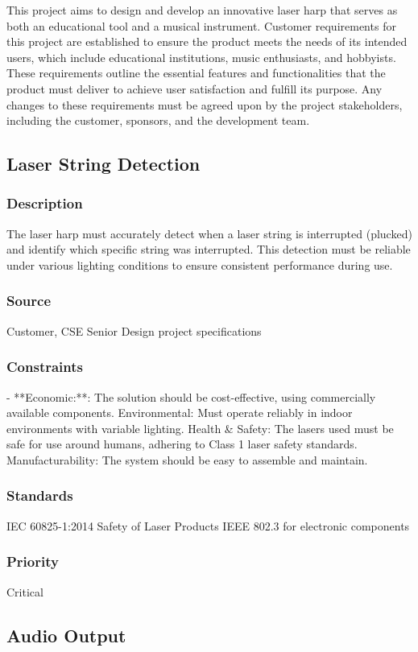 This project aims to design and develop an innovative laser harp that serves as both an educational tool and a musical instrument. Customer requirements for this project are established to ensure the product meets the needs of its intended users, which include educational institutions, music enthusiasts, and hobbyists. These requirements outline the essential features and functionalities that the product must deliver to achieve user satisfaction and fulfill its purpose. Any changes to these requirements must be agreed upon by the project stakeholders, including the customer, sponsors, and the development team.

\subsection{Laser String Detection}
\subsubsection{Description}
The laser harp must accurately detect when a laser string is interrupted (plucked) and identify which specific string was interrupted. This detection must be reliable under various lighting conditions to ensure consistent performance during use.
\subsubsection{Source}
Customer, CSE Senior Design project specifications
\subsubsection{Constraints}
- **Economic:**: The solution should be cost-effective, using commercially available components.
Environmental: Must operate reliably in indoor environments with variable lighting.
Health & Safety: The lasers used must be safe for use around humans, adhering to Class 1 laser safety standards.
Manufacturability: The system should be easy to assemble and maintain.
\subsubsection{Standards}
IEC 60825-1:2014 Safety of Laser Products
IEEE 802.3 for electronic components
\subsubsection{Priority}
Critical


\subsection{Audio Output}
